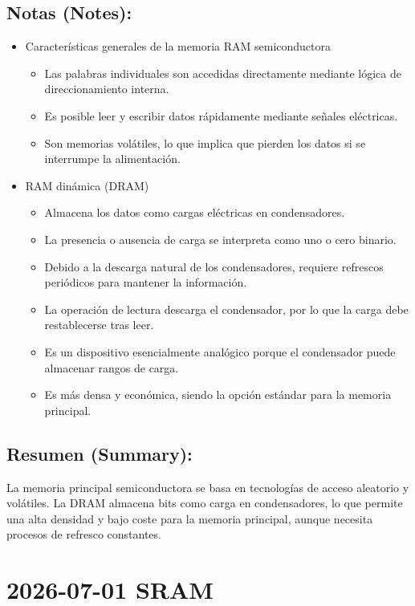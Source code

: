 \documentclass{article}
\begin{document}
\subsection{Notas (Notes):}
\label{sec:orgc4dfb6a}
\begin{itemize}
\item Características generales de la memoria RAM semiconductora
\begin{itemize}
\item Las palabras individuales son accedidas directamente mediante
lógica de direccionamiento interna.
\item Es posible leer y escribir datos rápidamente mediante señales
eléctricas.
\item Son memorias volátiles, lo que implica que pierden los datos si
se interrumpe la alimentación.
\end{itemize}
\item RAM dinámica (DRAM)
\begin{itemize}
\item Almacena los datos como cargas eléctricas en condensadores.
\item La presencia o ausencia de carga se interpreta como uno o cero
binario.
\item Debido a la descarga natural de los condensadores, requiere
refrescos periódicos para mantener la información.
\item La operación de lectura descarga el condensador, por lo que la
carga debe restablecerse tras leer.
\item Es un dispositivo esencialmente analógico porque el condensador
puede almacenar rangos de carga.
\item Es más densa y económica, siendo la opción estándar para la
memoria principal.
\end{itemize}
\end{itemize}

\subsection{Resumen (Summary):}
\label{sec:org98a4552}
La memoria principal semiconductora se basa en tecnologías de acceso
aleatorio y volátiles. La DRAM almacena bits como carga en
condensadores, lo que permite una alta densidad y bajo coste para la
memoria principal, aunque necesita procesos de refresco constantes.

\section{2026-07-01 SRAM}
\label{sec:org6f7f4ff}
\end{document}
